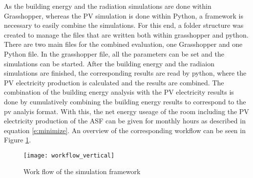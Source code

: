 
			As the building energy and the radiation simulations are done within Grasshopper, whereas the PV simulation is done within Python, a framework is necessary to easily combine the simulations. For this end, a folder structure was created to manage the files that are written both within grasshopper and python. There are two main files for the combined evaluation, one Grasshopper and one Python file. In the grasshopper file, all the parameters can be set and the simulations can be started. After the building energy and the radiaion simulations are finished, the corresponding results are read by python, where the PV electricity production is calculated and the results are combined. The combination of the building energy analysis with the PV electricity results is done by cumulatively combining the building energy results to correspond to the pv analyis format. With this, the net energy useage of the room including the PV electricity production of the ASF can be given for monthly hours as described in equation \ref{e:minimize}. An overview of the corresponding workflow can be seen in Figure \ref{fig:workflow}. 

			\begin{figure}[ht] %
				\begin{center}
				\texttt{[image: workflow\_vertical]}
				\caption{Work flow of the simulation framework}
				\label{fig:workflow}
				\end{center} 
			\end{figure}

